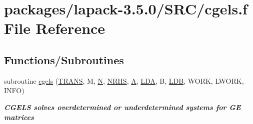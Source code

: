 \hypertarget{cgels_8f}{}\section{packages/lapack-\/3.5.0/\+S\+R\+C/cgels.f File Reference}
\label{cgels_8f}
\subsection*{Functions/\+Subroutines}
\begin{DoxyCompactItemize}
\item 
subroutine \hyperlink{group__complexGEsolve_ga009f11bc846e7a02af4650924230c38c}{cgels} (\hyperlink{superlu__enum__consts_8h_a0c4e17b2d5cea33f9991ccc6a6678d62a1f61e3015bfe0f0c2c3fda4c5a0cdf58}{T\+R\+A\+N\+S}, M, \hyperlink{polmisc_8c_a0240ac851181b84ac374872dc5434ee4}{N}, \hyperlink{example__user_8c_aa0138da002ce2a90360df2f521eb3198}{N\+R\+H\+S}, \hyperlink{classA}{A}, \hyperlink{example__user_8c_ae946da542ce0db94dced19b2ecefd1aa}{L\+D\+A}, B, \hyperlink{example__user_8c_a50e90a7104df172b5a89a06c47fcca04}{L\+D\+B}, W\+O\+R\+K, L\+W\+O\+R\+K, I\+N\+F\+O)
\begin{DoxyCompactList}\small\item\em {\bfseries  C\+G\+E\+L\+S solves overdetermined or underdetermined systems for G\+E matrices} \end{DoxyCompactList}\end{DoxyCompactItemize}
